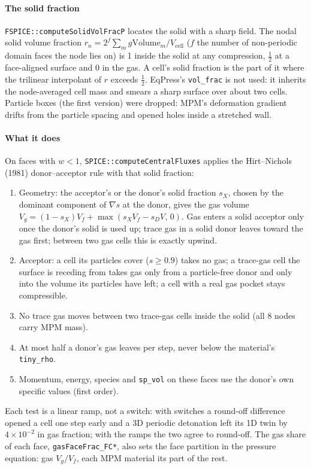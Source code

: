 \documentclass[11pt]{article}
\newcommand{\code}[1]{\texttt{\small #1}}
\begin{document}
\paragraph{The solid fraction}
\code{FSPICE::computeSolidVolFracP} locates the solid with a sharp field. The nodal solid
volume fraction $r_n = 2^{f}\sum_m g\mathrm{Volume}_m / V_\text{cell}$ ($f$ the number of
non-periodic domain faces the node lies on) is 1 inside the solid at any compression,
$\tfrac12$ at a face-aligned surface and 0 in the gas. A cell's solid fraction is the part of
it where the trilinear interpolant of $r$ exceeds $\tfrac12$. EqPress's \code{vol\_frac} is not
used: it inherits the node-averaged cell mass and smears a sharp surface over about two
cells. Particle boxes (the first version) were dropped: MPM's deformation gradient drifts
from the particle spacing and opened holes inside a stretched wall.

\paragraph{What it does}
On faces with $w<1$, \code{SPICE::computeCentralFluxes} applies the Hirt--Nichols (1981)
donor--acceptor rule with that solid fraction:
\begin{enumerate}[leftmargin=*]
  \item Geometry: the acceptor's or the donor's solid fraction $s_X$, chosen by the dominant
        component of $\nabla s$ at the donor, gives the gas volume
        $V_g = (1-s_X)V_f + \max(s_X V_f - s_D V,\,0)$. Gas enters a solid acceptor only once
        the donor's solid is used up; trace gas in a solid donor leaves toward the gas first;
        between two gas cells this is exactly upwind.
  \item Acceptor: a cell its particles cover ($s\ge 0.9$) takes no gas; a trace-gas cell the
        surface is receding from takes gas only from a particle-free donor and only into the
        volume its particles have left; a cell with a real gas pocket stays compressible.
  \item No trace gas moves between two trace-gas cells inside the solid (all 8 nodes carry
        MPM mass).
  \item At most half a donor's gas leaves per step, never below the material's
        \code{tiny\_rho}.
  \item Momentum, energy, species and \code{sp\_vol} on these faces use the donor's own
        specific values (first order).
\end{enumerate}
Each test is a linear ramp, not a switch: with switches a round-off difference opened a cell
one step early and a 3D periodic detonation left its 1D twin by $4\times10^{-2}$ in gas
fraction; with the ramps the two agree to round-off. The gas share of each face,
\code{gasFaceFrac\_FC*}, also sets the face partition in the pressure equation: gas $V_g/V_f$,
each MPM material its part of the rest.
\end{document}
